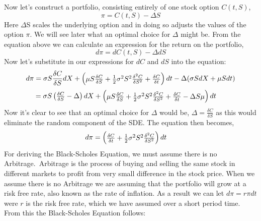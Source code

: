 \documentclass[11pt]{article}
\begin{document}
Now let's construct a portfolio, consisting entirely of one stock option $C(t,S)$,
\begin{equation}
\pi = C(t,S) - \Delta S
\end{equation}
Here $\Delta$S scales the underlying option and in doing so adjusts the values of the option $\pi$. We will see later what an optimal choice for $\Delta$ might be.
From the equation above we can calculate an expression for the return on the portfolio,
\begin{equation}
d\pi = dC(t,S) - \Delta dS
\end{equation}
Now let's substitute in our expressions for $dC$ and $dS$ into the equation:
\begin{equation*}
d \pi = \sigma S \frac{\delta C}{\delta S}dX + 
\setlength{\arraycolsep}{2pt}\begin{pmatrix} \mu S \frac{\delta C}{\delta S} + \frac{1}{2}\sigma^2 S^2\frac{\delta^2 C}{\delta S^2} + \frac{\delta C}{\delta t}\end{pmatrix}dt - \Delta(\sigma S dX + \mu S dt)
\end{equation*}
\begin{equation*}
= \sigma S \setlength{\arraycolsep}{2pt}\begin{pmatrix} \frac{\delta C}{\delta S} - \Delta \end{pmatrix}dX + 
\setlength{\arraycolsep}{2pt}\begin{pmatrix} \mu S \frac{\delta C}{\delta S} + \frac{1}{2}\sigma^2 S^2\frac{\delta^2 C}{\delta S^2} + \frac{\delta C}{\delta t} - \Delta S \mu
\end{pmatrix}dt \phantom{ccc}
\end{equation*}
Now it's clear to see that an optimal choice for $\Delta$ would be, $\Delta = \frac{\delta C}{\delta S}$ as this would eliminate the random component of the SDE. The equation then becomes,
\begin{equation*}
d \pi = 
\setlength{\arraycolsep}{2pt}\begin{pmatrix}
\frac{\delta C}{\delta t} + \frac{1}{2}\sigma^2 S^2\frac{\delta^2 C}{\delta S^2}
\end{pmatrix}dt \phantom{ccc}
\end{equation*}
For deriving the Black-Scholes Equation, we must assume there is no Arbitrage.\ Arbitrage is the process of buying and selling the same stock in different markets to profit from very small difference in the stock price. When we assume there is no Arbitrage we are assuming that the portfolio will grow at a risk free rate, also known as the rate of inflation. As a result we can let $d \pi = r\pi dt$ were $r$ is the risk free rate, which we have assumed over a short period time. From this the Black-Scholes Equation follows:
\end{document}
